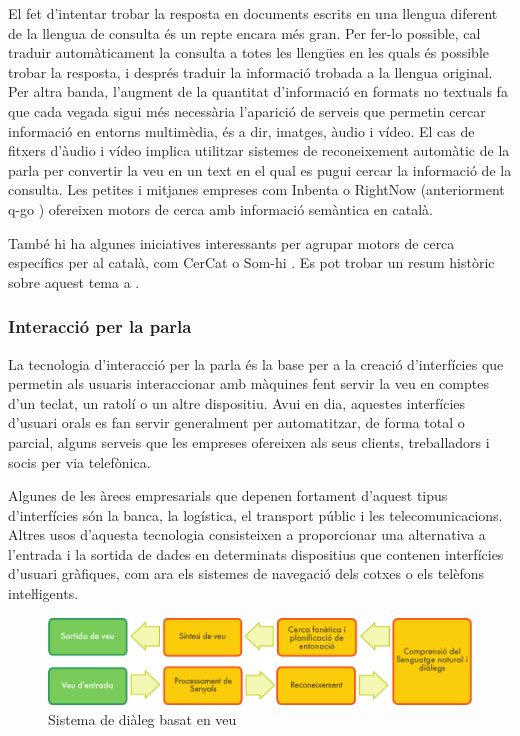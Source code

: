 \begin{multicols}{2}
El fet d’intentar trobar la resposta en documents escrits en una llengua diferent de la llengua de consulta és un repte encara més gran. Per fer-lo possible, cal traduir automàticament la consulta a totes les llengües en les quals és possible trobar la resposta, i després traduir la informació trobada a la llengua original. Per altra banda, l’augment de la quantitat d’informació en formats no textuals fa que cada vegada sigui més necessària l’aparició de serveis que permetin cercar informació en entorns multimèdia, és a dir, imatges, àudio i vídeo. El cas de fitxers d’àudio i vídeo implica utilitzar sistemes de reconeixement automàtic de la parla per convertir la veu en un text en el qual es pugui cercar la informació de la consulta. Les petites i mitjanes empreses com Inbenta \cite{CAT-inbenta} o RightNow  (anteriorment q-go \cite{CAT-rightnow}) ofereixen motors de cerca amb informació semàntica en català.


També hi ha algunes iniciatives interessants per agrupar motors de cerca específics per al català, com CerCat o Som-hi \cite{CAT-cercadors}. Es pot trobar un resum històric sobre aquest tema a \cite{CAT-Resum-sobre-cercadors}.
  
\subsubsection{Interacció per la parla}

La tecnologia d’interacció per la parla és la base per a la creació d’interfícies que permetin als usuaris interaccionar amb màquines fent servir la veu en comptes d’un teclat, un ratolí o un altre dispositiu. Avui en dia, aquestes interfícies d’usuari orals es fan servir generalment per automatitzar, de forma total o parcial, alguns serveis que les empreses ofereixen als seus clients, treballadors i socis per via telefònica.

Algunes de les àrees empresarials que depenen fortament d’aquest tipus d’interfícies són la banca, la logística, el transport públic i les telecomunicacions. Altres usos d’aquesta tecnologia consisteixen a proporcionar una alternativa a l’entrada i la sortida de dades en determinats dispositius que contenen interfícies d’usuari gràfiques, com ara els sistemes de navegació dels cotxes o els telèfons inteŀligents. 

\begin{figure}[htb]
  \center  \includegraphics[width=\textwidth]{../_media/catalan/simple_speech-based_dialogue_architecture}
  \center
  \caption{Sistema de diàleg basat en veu}
  \label{fig:dialoguearch_ca}
\end{figure}


\end{multicols}
